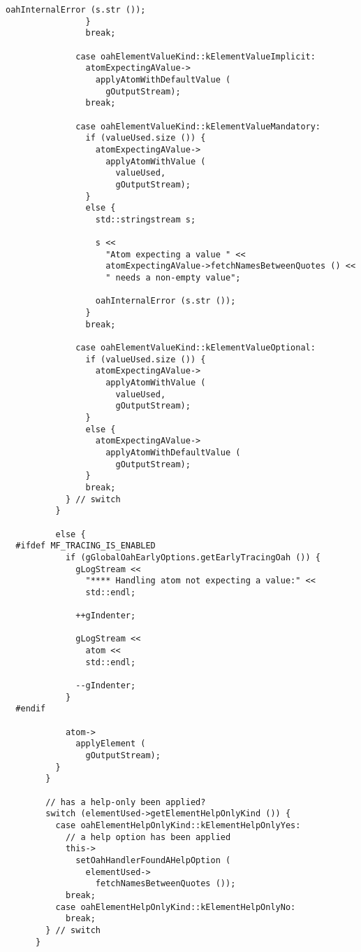 {\begin{lstlisting}[language=CPlusPlus]
                  oahInternalError (s.str ());
                }
                break;

              case oahElementValueKind::kElementValueImplicit:
                atomExpectingAValue->
                  applyAtomWithDefaultValue (
                    gOutputStream);
                break;

              case oahElementValueKind::kElementValueMandatory:
                if (valueUsed.size ()) {
                  atomExpectingAValue->
                    applyAtomWithValue (
                      valueUsed,
                      gOutputStream);
                }
                else {
                  std::stringstream s;

                  s <<
                    "Atom expecting a value " <<
                    atomExpectingAValue->fetchNamesBetweenQuotes () <<
                    " needs a non-empty value";

                  oahInternalError (s.str ());
                }
                break;

              case oahElementValueKind::kElementValueOptional:
                if (valueUsed.size ()) {
                  atomExpectingAValue->
                    applyAtomWithValue (
                      valueUsed,
                      gOutputStream);
                }
                else {
                  atomExpectingAValue->
                    applyAtomWithDefaultValue (
                      gOutputStream);
                }
                break;
            } // switch
          }

          else {
  #ifdef MF_TRACING_IS_ENABLED
            if (gGlobalOahEarlyOptions.getEarlyTracingOah ()) {
              gLogStream <<
                "**** Handling atom not expecting a value:" <<
                std::endl;

              ++gIndenter;

              gLogStream <<
                atom <<
                std::endl;

              --gIndenter;
            }
  #endif

            atom->
              applyElement (
                gOutputStream);
          }
        }

        // has a help-only been applied?
        switch (elementUsed->getElementHelpOnlyKind ()) {
          case oahElementHelpOnlyKind::kElementHelpOnlyYes:
            // a help option has been applied
            this->
              setOahHandlerFoundAHelpOption (
                elementUsed->
                  fetchNamesBetweenQuotes ());
            break;
          case oahElementHelpOnlyKind::kElementHelpOnlyNo:
            break;
        } // switch
      }


\end{lstlisting}}
